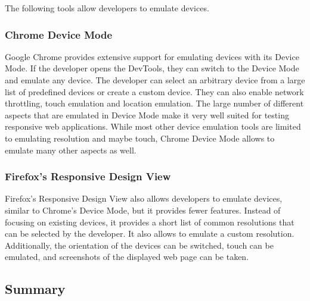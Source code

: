 The following tools allow developers to emulate devices. 

\subsubsection{Chrome Device Mode}

Google Chrome provides extensive support for emulating devices with its Device Mode. If the developer opens the DevTools, they can switch to the Device Mode and emulate any device. The developer can select an arbitrary device from a large list of predefined devices or create a custom device. They can also enable network throttling, touch emulation and location emulation. The large number of different aspects that are emulated in Device Mode make it very well suited for testing responsive web applications. While most other device emulation tools are limited to emulating resolution and maybe touch, Chrome Device Mode allows to emulate many other aspects as well.

\subsubsection{Firefox's Responsive Design View}

Firefox's Responsive Design View also allows developers to emulate devices, similar to Chrome's Device Mode, but it provides fewer features. Instead of focusing on existing devices, it provides a short list of common resolutions that can be selected by the developer. It also allows to emulate a custom resolution. Additionally, the orientation of the devices can be switched, touch can be emulated, and screenshots of the displayed web page can be taken.

\subsection{Summary}

